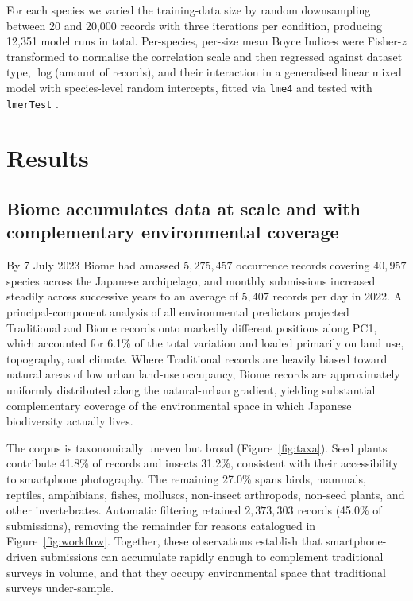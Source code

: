 \documentclass[11pt]{article}
\begin{document}
For each species we varied the training-data size by random downsampling between 20 and 20{,}000 records with three iterations per condition, producing 12{,}351 model runs in total. Per-species, per-size mean Boyce Indices were Fisher-$z$ transformed to normalise the correlation scale and then regressed against dataset type, $\log$(amount of records), and their interaction in a generalised linear mixed model with species-level random intercepts, fitted via \texttt{lme4} \citep{bates2015lme4} and tested with \texttt{lmerTest} \citep{kuznetsova2017lmertest}.

\section{Results}

\subsection{Biome accumulates data at scale and with complementary environmental coverage}

By 7 July 2023 Biome had amassed $5{,}275{,}457$ occurrence records covering $40{,}957$ species across the Japanese archipelago, and monthly submissions increased steadily across successive years to an average of $5{,}407$ records per day in 2022. A principal-component analysis of all environmental predictors projected Traditional and Biome records onto markedly different positions along PC1, which accounted for 6.1\% of the total variation and loaded primarily on land use, topography, and climate. Where Traditional records are heavily biased toward natural areas of low urban land-use occupancy, Biome records are approximately uniformly distributed along the natural-urban gradient, yielding substantial complementary coverage of the environmental space in which Japanese biodiversity actually lives.

The corpus is taxonomically uneven but broad (Figure~\ref{fig:taxa}). Seed plants contribute 41.8\% of records and insects 31.2\%, consistent with their accessibility to smartphone photography. The remaining 27.0\% spans birds, mammals, reptiles, amphibians, fishes, molluscs, non-insect arthropods, non-seed plants, and other invertebrates. Automatic filtering retained $2{,}373{,}303$ records (45.0\% of submissions), removing the remainder for reasons catalogued in Figure~\ref{fig:workflow}. Together, these observations establish that smartphone-driven submissions can accumulate rapidly enough to complement traditional surveys in volume, and that they occupy environmental space that traditional surveys under-sample.
\end{document}
